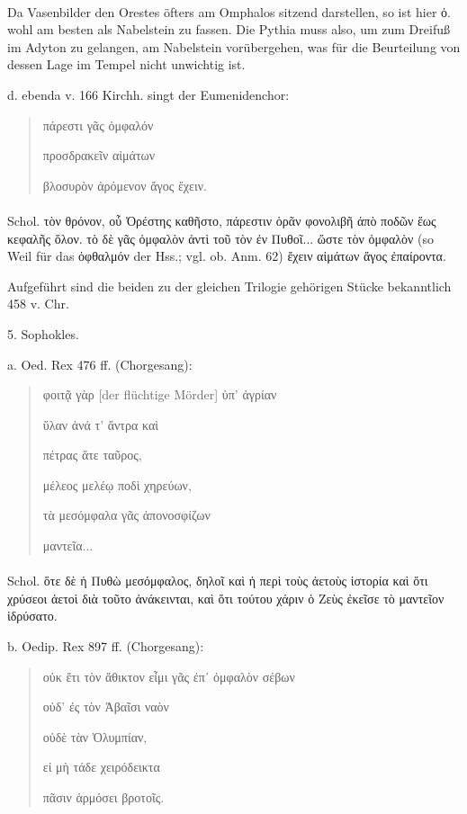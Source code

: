 \documentclass[a4paper, 11pt, oneside]{article}
\begin{document}
\paragraph{} 
Da Vasenbilder den Orestes öfters am Omphalos sitzend darstellen, so ist hier ὀ. wohl am besten als Nabelstein zu fassen. Die Pythia muss also, um zum Dreifuß im Adyton zu gelangen, am Nabelstein vorübergehen, was für die Beurteilung von dessen Lage im Tempel nicht unwichtig ist.

d. ebenda v. 166 Kirchh. singt der Eumenidenchor:
\begin{quotation}
πάρεστι γᾶς ὀμφαλόν

προσδρακεῖν αἰμάτων

βλοσυρὸν ἀρόμενον ἄγος ἔχειν.
\end{quotation}
\paragraph{}
Schol. τὸν θρόνον, οὗ Ὀρέστης καθῆστο, πάρεστιν ὁρᾶν φονολιβῆ ἀπὸ ποδῶν ἕως κεφαλῆς ὅλον. τὸ δὲ γᾶς ὀμφαλὸν ἀντὶ τοῦ τὸν ἐν Πυθοῖ... ὥστε τὸν ὀμφαλὸν (so Weil für das ὀφθαλμόν der Hss.; vgl. ob. Anm. 62) ἔχειν αἱμάτων ἄγος ἐπαίροντα.

Aufgeführt sind die beiden zu der gleichen Trilogie gehörigen Stücke bekanntlich 458 v. Chr.

5. Sophokles.

a. Oed. Rex 476 ff. (Chorgesang):
\begin{quotation}
φοιτᾷ γὰρ [der flüchtige Mörder] ὑπ' ἀγρίαν

ὕλαν ἀνά τ' ἄντρα καὶ

πέτρας ἅτε ταῦρος,

μέλεος μελέῳ ποδὶ χηρεύων,

τὰ μεσόμφαλα γᾶς ἀπονοσφίζων

μαντεῖα...
\end{quotation}
\paragraph{}
Schol. ὅτε δὲ ἡ Πυθὼ μεσόμφαλος, δηλοῖ καὶ ἡ περὶ τοὺς ἀετοὺς ἱστορία καὶ ὅτι χρύσεοι ἀετοὶ διὰ τοῦτο ἀνάκεινται, καὶ ὅτι τούτου χάριν ὁ Ζεὺς ἐκεῖσε τὸ μαντεῖον ἱδρύσατο.

b. Oedip. Rex 897 ff. (Chorgesang):
\begin{quotation}
οὐκ ἔτι τὸν ἄθικτον εἶμι γᾶς ἐπ᾿ ὀμφαλὸν σέβων

οὐδ' ἐς τὸν Ἀβαῖσι ναὸν

οὐδὲ τὰν Ὀλυμπίαν,

εἰ μὴ τάδε χειρόδεικτα

πᾶσιν ἁρμόσει βροτοῖς.
\end{quotation}
\end{document}
